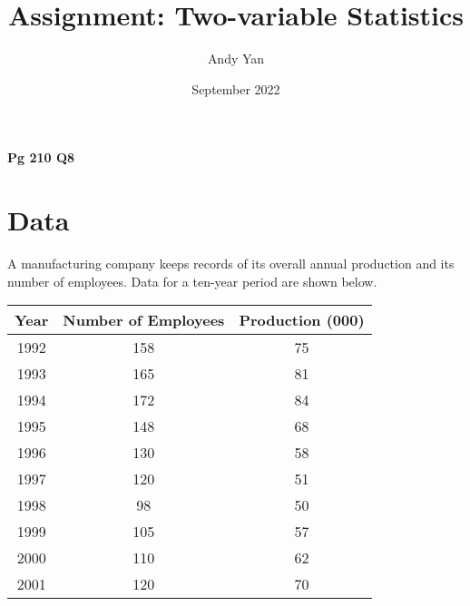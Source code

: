\documentclass{article}
\title{Assignment: Two-variable Statistics}
\author{Andy Yan}
\date{September 2022}
\begin{document}
\maketitle
\textbf{Pg 210 Q8}
\section{Data}
A manufacturing company keeps records of its overall annual production and its number of employees. Data for a ten-year period are shown below. 
\begin{center}
\def\arraystretch{1}
{\setlength{\tabcolsep}{3em}
\begin{tabular}{| c | c | c |} 
 \hline
   Year & Number of Employees & Production (000)\\ 
 \hline
1992    & 158 & 75\\
 \hline
1993	& 165 & 81\\
 \hline
1994	& 172 & 84\\
 \hline
1995	& 148 & 68\\
 \hline
1996	& 130 & 58\\
 \hline
1997	& 120 & 51\\
 \hline
1998	& 98 & 50\\
 \hline
1999	& 105 & 57\\
 \hline
2000	& 110 & 62\\
 \hline
2001	& 120 & 70\\
  \hline
\end{tabular}}
\end{center}
\end{document}
